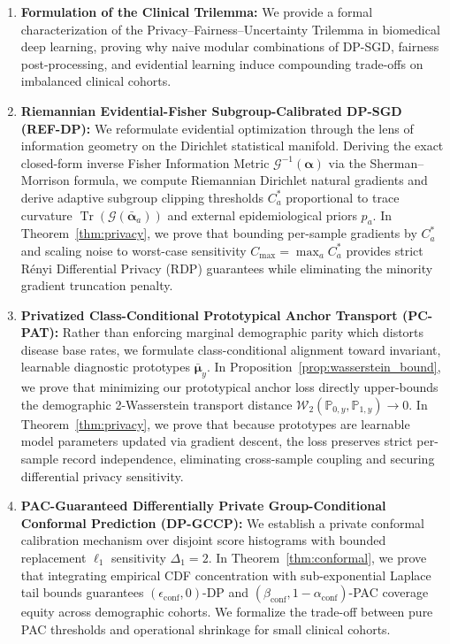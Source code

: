 \documentclass[3p,12pt]{elsarticle}
\theoremstyle{plain}
\theoremstyle{definition}
\begin{document}
\begin{enumerate}
    \item \textbf{Formulation of the Clinical Trilemma:} We provide a formal characterization of the Privacy--Fairness--Uncertainty Trilemma in biomedical deep learning, proving why naive modular combinations of DP-SGD, fairness post-processing, and evidential learning induce compounding trade-offs on imbalanced clinical cohorts.
    \item \textbf{Riemannian Evidential-Fisher Subgroup-Calibrated DP-SGD (REF-DP):} We reformulate evidential optimization through the lens of information geometry on the Dirichlet statistical manifold. Deriving the exact closed-form inverse Fisher Information Metric $\mathcal{G}^{-1}(\boldsymbol{\alpha})$ via the Sherman--Morrison formula, we compute Riemannian Dirichlet natural gradients and derive adaptive subgroup clipping thresholds $C_a^*$ proportional to trace curvature $\operatorname{Tr}(\mathcal{G}(\bar{\boldsymbol{\alpha}}_a))$ and external epidemiological priors $p_a$. In Theorem~\ref{thm:privacy}, we prove that bounding per-sample gradients by $C_a^*$ and scaling noise to worst-case sensitivity $C_{\max} = \max_a C_a^*$ provides strict Rényi Differential Privacy (RDP) guarantees while eliminating the minority gradient truncation penalty.
    \item \textbf{Privatized Class-Conditional Prototypical Anchor Transport (PC-PAT):} Rather than enforcing marginal demographic parity which distorts disease base rates, we formulate class-conditional alignment toward invariant, learnable diagnostic prototypes $\bar{\boldsymbol{\mu}}_y$. In Proposition~\ref{prop:wasserstein_bound}, we prove that minimizing our prototypical anchor loss directly upper-bounds the demographic 2-Wasserstein transport distance $\mathcal{W}_2(\mathbb{P}_{0, y}, \mathbb{P}_{1, y}) \to 0$. In Theorem~\ref{thm:privacy}, we prove that because prototypes are learnable model parameters updated via gradient descent, the loss preserves strict per-sample record independence, eliminating cross-sample coupling and securing differential privacy sensitivity.
    \item \textbf{PAC-Guaranteed Differentially Private Group-Conditional Conformal Prediction (DP-GCCP):} We establish a private conformal calibration mechanism over disjoint score histograms with bounded replacement $\ell_1$ sensitivity $\Delta_1 = 2$. In Theorem~\ref{thm:conformal}, we prove that integrating empirical CDF concentration with sub-exponential Laplace tail bounds guarantees $(\epsilon_{\text{conf}}, 0)$-DP and $(\beta_{\text{conf}}, 1-\alpha_{\text{conf}})$-PAC coverage equity across demographic cohorts. We formalize the trade-off between pure PAC thresholds and operational shrinkage for small clinical cohorts.

\end{enumerate}
\end{document}
